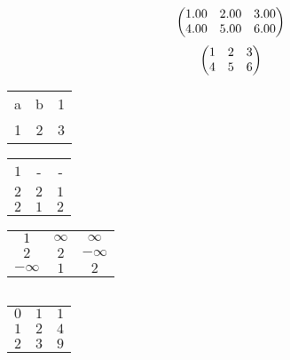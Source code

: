 \begin{align*}
  \begin{pmatrix}
    $1.00$ & $2.00$ & $3.00$\\
    $4.00$ & $5.00$ & $6.00$\\
  \end{pmatrix}
\end{align*}
\begin{align*}
  \begin{pmatrix}
    $1$ & $2$ & $3$\\
    $4$ & $5$ & $6$\\
  \end{pmatrix}
\end{align*}
\begin{table}[htp]
  \begin{center}
    \begin{tabular}{ccc}
      \toprule
      a & b & 1\\
      1 & 2 & 3\\
      \bottomrule
    \end{tabular}
  \end{center}
\end{table}
\begin{table}[htp]
  \begin{center}
    \begin{tabular}{ccc}
      \toprule
      $1$ & {-} & {-}\\
      $2$ & $2$ & $1$\\
      $2$ & $1$ & $2$\\
      \bottomrule
    \end{tabular}
  \end{center}
\end{table}
\begin{table}[htp]
  \begin{center}
    \begin{tabular}{ccc}
      \toprule
      $1$ & $\infty$ & $\infty$\\
      $2$ & $2$ & $-\infty$\\
      $-\infty$ & $1$ & $2$\\
      \bottomrule
    \end{tabular}
  \end{center}
\end{table}
\begin{table}[htp]
  \begin{center}
    \begin{tabular}{c}
      \toprule
      \bottomrule
    \end{tabular}
  \end{center}
\end{table}
\begin{table}[htp]
	\begin{center}
		\begin{tabular}{ccc}
		\toprule
			$0$ & $1$ & $1$\\
			$1$ & $2$ & $4$\\
			$2$ & $3$ & $9$\\
		\bottomrule
		\end{tabular}
	\end{center}
\end{table}